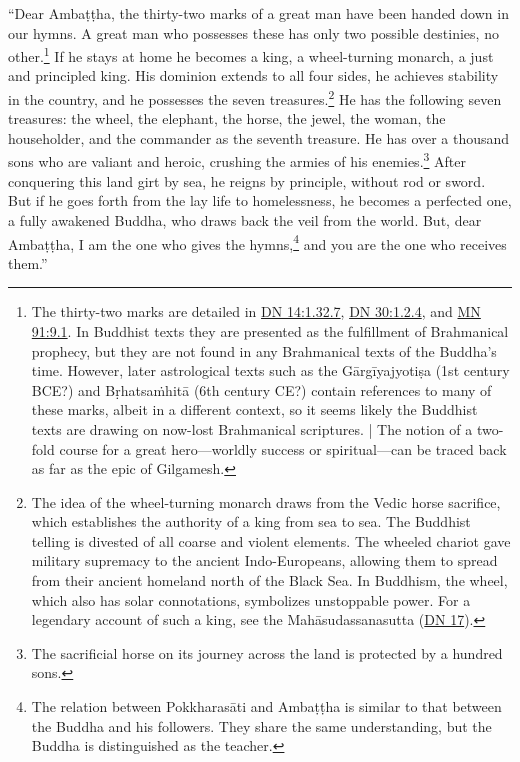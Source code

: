 \documentclass[12pt,openany]{book}%
\begin{document}
“Dear \textsanskrit{Ambaṭṭha}, the thirty-two marks of a great man have been handed down in our hymns. A great man who possesses these has only two possible destinies, no other.\footnote{The thirty-two marks are detailed in \href{https://suttacentral.net/dn14/en/sujato\#1.32.7}{DN 14:1.32.7}, \href{https://suttacentral.net/dn30/en/sujato\#1.2.4}{DN 30:1.2.4}, and \href{https://suttacentral.net/mn91/en/sujato\#9.1}{MN 91:9.1}. In Buddhist texts they are presented as the fulfillment of Brahmanical prophecy, but they are not found in any Brahmanical texts of the Buddha’s time. However, later astrological texts such as the \textsanskrit{Gārgīyajyotiṣa} (1st century BCE?) and \textsanskrit{Bṛhatsaṁhitā} (6th century CE?) contain references to many of these marks, albeit in a different context, so it seems likely the Buddhist texts are drawing on now-lost Brahmanical scriptures. | The notion of a two-fold course for a great hero—worldly success or spiritual—can be traced back as far as the epic of Gilgamesh. } If he stays at home he becomes a king, a wheel-turning monarch, a just and principled king. His dominion extends to all four sides, he achieves stability in the country, and he possesses the seven treasures.\footnote{The idea of the wheel-turning monarch draws from the Vedic horse sacrifice, which establishes the authority of a king from sea to sea. The Buddhist telling is divested of all coarse and violent elements. The wheeled chariot gave military supremacy to the ancient Indo-Europeans, allowing them to spread from their ancient homeland north of the Black Sea. In Buddhism, the wheel, which also has solar connotations, symbolizes unstoppable power. For a legendary account of such a king, see the \textsanskrit{Mahāsudassanasutta} (\href{https://suttacentral.net/dn17/en/sujato}{DN 17}). } He has the following seven treasures: the wheel, the elephant, the horse, the jewel, the woman, the householder, and the commander as the seventh treasure. He has over a thousand sons who are valiant and heroic, crushing the armies of his enemies.\footnote{The sacrificial horse on its journey across the land is protected by a hundred sons. } After conquering this land girt by sea, he reigns by principle, without rod or sword. But if he goes forth from the lay life to homelessness, he becomes a perfected one, a fully awakened Buddha, who draws back the veil from the world. But, dear \textsanskrit{Ambaṭṭha}, I am the one who gives the hymns,\footnote{The relation between \textsanskrit{Pokkharasāti} and \textsanskrit{Ambaṭṭha} is similar to that between the Buddha and his followers. They share the same understanding, but the Buddha is distinguished as the teacher. } and you are the one who receives them.” 
\end{document}
